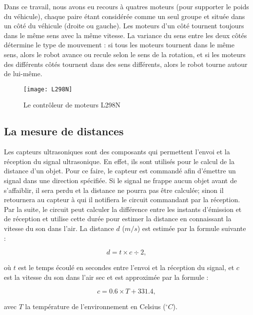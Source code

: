 Dans ce travail, nous avons eu recours à quatres moteurs
(pour supporter le poids du véhicule), chaque paire étant considérée comme un
seul groupe et située dans un côté du véhicule (droite ou gauche).
Les moteurs d'un côté tournent toujours dans le même sens avec la même vitesse.
La variance du sens entre les deux côtés détermine le type de mouvement : si
tous les moteurs tournent dans le même sens, alors le robot avance ou recule
selon le sens de la rotation, et si les moteurs des différents côtés tournent dans
des sens différents, alors le robot tourne autour de lui-même.

\begin{figure}[h]
\begin{center}
\texttt{[image: L298N]}
\caption{Le contrôleur de moteurs L298N}{}
\end{center}
\end{figure}

\subsection{La mesure de distances}

Les capteurs ultrasoniques sont des composants qui permettent l'envoi et la
réception du signal ultrasonique. En effet, ils sont utilisés pour le calcul
de la distance d'un objet. Pour ce faire, le capteur est commandé afin d'émettre
un signal dans une direction spécifiée. Si le signal ne frappe aucun objet avant de
s'affaiblir, il sera perdu et la distance ne pourra pas être calculée; sinon il
retournera au capteur à qui il notifiera le circuit commandant par la réception.
Par la suite, le circuit peut calculer la différence entre les instants d'émission
et de réception et utilise cette durée pour estimer la distance en connaissant
la vitesse du son dans l'air. La distance $d$ ($m/s$) est estimée par la formule suivante :

\begin{equation}
  d = t \times c \div 2,
\end{equation}

où $t$ est le temps écoulé en secondes entre l'envoi et la réception du signal,
et $c$ est la vitesse du son dans l'air sec et est approximée par la formule :

\begin{equation}
  c = 0.6 \times T + 331.4,
\end{equation}

avec $T$ la température de l'environnement en Celsius ($ ^\circ C$).

